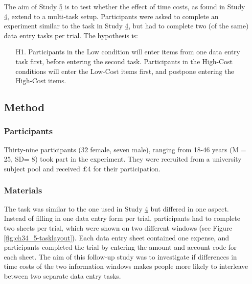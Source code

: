 The aim of Study \hyperref[st:Study5]{5} is to test whether the effect of time costs, as found in Study \hyperref[st:Study4]{4}, extend to a multi-task setup. Participants were asked to complete an experiment similar to the task in Study \hyperref[st:Study4]{4}, but had to complete two (of the same) data entry tasks per trial. The hypothesis is:

\begin{itemize}
\item [H1.]
Participants in the Low condition will enter items from one data entry task first, before entering the second task. Participants in the High-Cost conditions will enter the Low-Cost items first, and postpone entering the High-Cost items.
\end{itemize}

\subsection{Method}
\subsubsection{Participants}
Thirty-nine participants (32 female, seven male), ranging from 18-46 years (M = 25, SD= 8) took part in the experiment. They were recruited from a university subject pool and received $\pounds$4 for their participation.

\subsubsection{Materials}
The task was similar to the one used in Study \hyperref[st:Study4]{4} but differed in one aspect. Instead of filling in one data entry form per trial, participants had to complete two sheets per trial, which were shown on two different windows (see Figure \ref{fig:ch34_5-tasklayout}). Each data entry sheet contained one expense, and participants completed the trial by entering the amount and account code for each sheet. The aim of this follow-up study was to investigate if differences in time costs of the two information windows makes people more likely to interleave between two separate data entry tasks.


